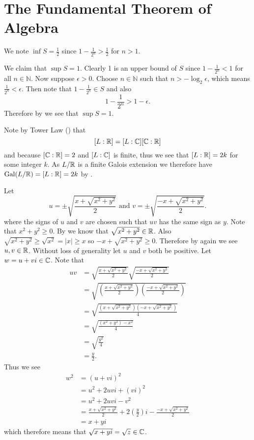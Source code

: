 \section{The Fundamental Theorem of Algebra}
\begin{questions}
    \item We note $\inf S = \frac12$ since $1 - \frac1{2^n} > 
    \frac12$ for $n > 1$.

    We claim that $\sup S = 1$. Clearly 1 is an upper bound of $S$ since $1 - \frac1{2^n} < 1$ for all $n \in \mathbb{N}$. Now suppose $\epsilon > 0$. Choose $n \in \mathbb{N}$ such that $n > -\log_2\epsilon$, which means $\frac1{2^n} < \epsilon$. Then note that $1 - \frac1{2^n} \in S$ and also
    \[
        1 - \frac1{2^n} > 1 - \epsilon.
    \]
    Therefore by  we see that $\sup S = 1$.

    \item Note by Tower Law () that
    \[
        [L:\mathbb{R}] = [L:\mathbb{C}][\mathbb{C}:\mathbb{R}]
    \]
    and because $[\mathbb{C}:\mathbb{R}] = 2$ and $[L:\mathbb{C}]$ is finite, thus we see that $[L:\mathbb{R}] = 2k$ for some integer $k$. As $L/\mathbb{R}$ is a finite Galois extension we therefore have $\mathrm{Gal}(L/\mathbb{R}) = [L:\mathbb{R}] = 2k$ by . 

    \item Let
    \[
        u = \pm\sqrt{\frac{x + \sqrt{x^2+y^2}}{2}} \text{ and } v = \pm\sqrt{\frac{-x + \sqrt{x^2+y^2}}{2}}.
    \]
    where the signs of $u$ and $v$ are chosen such that $uv$ has the same sign as $y$. Note that $x^2 + y^2 \geq 0$. By  we know that $\sqrt{x^2+y^2} \in \mathbb{R}$. Also $\sqrt{x^2+y^2} \geq \sqrt{x^2} = |x| \geq x$ so $-x + \sqrt{x^2+y^2} \geq 0$. Therefore by  again we see $u, v \in \mathbb{R}$. Without loss of generality let $u$ and $v$ both be positive. Let $w = u + vi \in \mathbb{C}$. Note that
    \begin{align*}
        uv &= \sqrt{\frac{x + \sqrt{x^2+y^2}}{2}}\sqrt{\frac{-x + \sqrt{x^2+y^2}}{2}}\\
        &= \sqrt{\left(\frac{x + \sqrt{x^2+y^2}}{2}\right)\left(\frac{-x + \sqrt{x^2+y^2}}{2}\right)}\\
        &= \sqrt{\frac{\left(x + \sqrt{x^2+y^2}\right)\left(-x + \sqrt{x^2+y^2}\right)}{4}}\\
        &= \sqrt{\frac{(x^2+y^2)-x^2}{4}}\\
        &= \sqrt{\frac{y^2}4}\\
        &= \frac y2.
    \end{align*}
    Thus we see
    \begin{align*}
        w^2 &= (u+vi)^2\\
        &= u^2 + 2uvi + (vi)^2\\
        &= u^2 + 2uvi - v^2\\
        &= \frac{x + \sqrt{x^2+y^2}}{2} + 2\left(\frac y2\right)i - \frac{-x + \sqrt{x^2+y^2}}{2}\\
        &= x + yi
    \end{align*}
    which therefore means that $\sqrt{x+yi} = \sqrt{z} \in \mathbb{C}$.
\end{questions}
